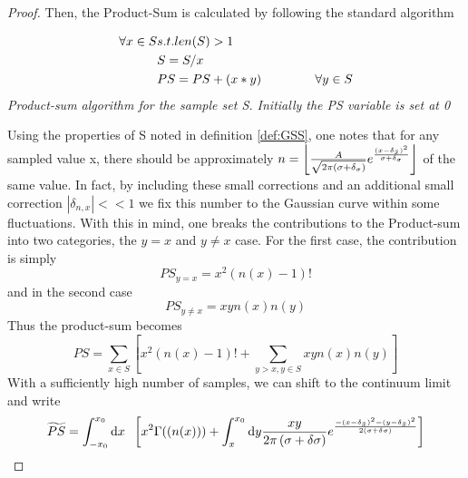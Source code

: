 \begin{proof}{}
		Then, the Product-Sum is calculated by following the standard algorithm 
		\newline
		\begin{algo}
		\begin{equation}
			\begin{split}
				\forall{x} \in {S} & s.t. len(S) > 1\\
				& S = S / x  \\
				& PS = PS + ( x * y ) \hspace{1.5 cm} \forall y \in S \\	
			\end{split}	
		\end{equation}
		\textit{Product-sum algorithm for the sample set S. Initially the PS variable is set at 0}
		\end{algo}
		Using the properties of S noted in definition \ref{def:GSS}, one notes that for any sampled value x, there should be approximately $n= \left\lfloor {\frac{A}{\sqrt{2 \pi (\sigma+ \delta_\sigma)}} e^{\frac{\left( x - \delta_{\bar{x}} \right)^2}{\sigma+\delta_\sigma}}} \right\rfloor$ of the same value. 
		In fact, by including these small corrections and an additional small correction $\left|\delta_{n, x}\right| << 1$  we fix this number to the Gaussian curve within some fluctuations. 
	With this in mind, one breaks the contributions to the Product-sum into two categories, the $y=x$ and $y \neq x$ case. 
	For the first case, the contribution is simply 
	\begin{equation}
		PS_{y=x} = x^2 \left( n(x) - 1 \right)! 
	\end{equation}
	and in the second case 
	\begin{equation}
		PS_{y\neq x} = x y n(x) n(y)
	\end{equation}
	Thus the product-sum becomes
	\begin{equation}
		PS = \sum_{x\in S}\left[  x^2 \left(n(x) - 1\right)! + \sum_{y > x, y\in S}x y n(x)n(y) \right] 
	\end{equation}
	With a sufficiently high number of samples, we can shift to the continuum limit and write
	\begin{equation}
		\widetilde{PS} = \int_{-x_0}^{x_0} \textrm{d} x \hspace{0.2 cm} \left[ x^2 \Gamma(\left(n(x)\right)) + \int_{x}^{x_{0}} \textrm{d} y \frac{xy}{2 \pi \left( \sigma + \delta \sigma \right)} e^{\frac{- \left( x - \delta_{\bar{x}} \right)^2 - \left( y - \delta_{\bar{x}} \right)^2}{2 \left( \sigma + \delta \sigma\right)}}   \right]
	\end{equation}

\end{proof}
